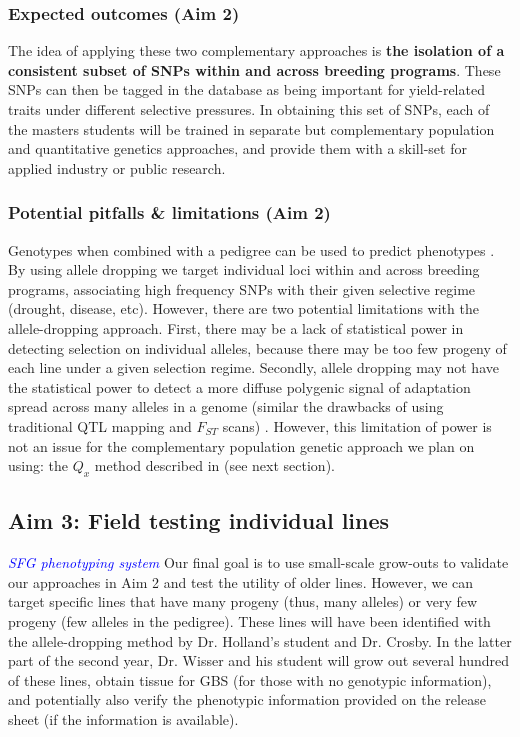 \documentclass[12pt]{article}
\newcommand{\jri}[1]{\textcolor{blue}{ \emph{\scriptsize  #1}} }
\begin{document}
\subsubsection*{Expected outcomes (Aim 2)}

The idea of applying these two complementary approaches is \textbf{the isolation of a consistent subset of SNPs within and across breeding programs}. 
These SNPs can then be tagged in the database as being important for yield-related traits under different selective pressures.
In obtaining this set of SNPs, each of the masters students will be trained in separate but complementary population and quantitative genetics approaches, and provide them with a skill-set for applied industry or public research. 

\subsubsection*{Potential pitfalls \& limitations (Aim 2)}
Genotypes when combined with a pedigree can be used to predict phenotypes \citep{de2009predicting,crossa2010prediction,Decker:2012kd}.
By using allele dropping we target individual loci within and across breeding programs, associating high frequency SNPs with their given selective regime (drought, disease, etc). 
However, there are two potential limitations with the allele-dropping approach. First, there may be a lack of statistical power in detecting selection on individual alleles, because there may be too few progeny of each line under a given selection regime. 
Secondly, allele dropping may not have the statistical power to detect a more diffuse polygenic signal of adaptation spread across many alleles in a genome (similar the drawbacks of using traditional QTL mapping and $F_{ST}$ scans) \cite{Rockman:2011ej, Berg:2014bs}. 
However, this limitation of power is not an issue for the complementary population genetic approach we plan on using: the $Q_{x}$ method described in \cite{Berg:2014bs} (see next section). 

\subsection*{Aim 3: Field testing individual lines}
\jri{ SFG phenotyping system}
Our final goal is to use small-scale grow-outs to validate our approaches in Aim 2 and test the utility of older lines.
However, we can target specific lines that have many progeny (thus, many alleles) or very few progeny (few alleles in the pedigree). These lines will have been identified with the allele-dropping method by Dr. Holland's student and Dr. Crosby. 
In the latter part of the second year, Dr. Wisser and his student will grow out several hundred of these lines, obtain tissue for GBS (for those with no genotypic information), and potentially also verify the phenotypic information provided on the release sheet (if the information is available). 
\end{document}
